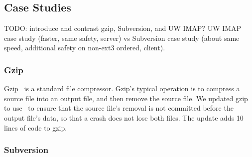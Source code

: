 \subsection{Case Studies}
\label{sec:opgroup:casestudies}

TODO: introduce and contrast gzip, Subversion, and UW IMAP?
%
UW IMAP case study (faster, same safety, server) vs
Subversion case study (about same speed, additional safety on non-ext3
ordered, client).

\subsubsection{Gzip}
\label{sec:opgroup:gzip}

Gzip~\cite{gzip} is a standard file compressor.
%
Gzip's typical operation is to compress a source file into an output file,
and then remove the source file.
%
We updated gzip to use \opgroups\ to ensure that the source file's
removal is not committed before the output file's data, so that a
crash does not lose both files. The update adds 10 lines of code to
gzip.

\subsubsection{Subversion}
\label{sec:opgroup:svn}

